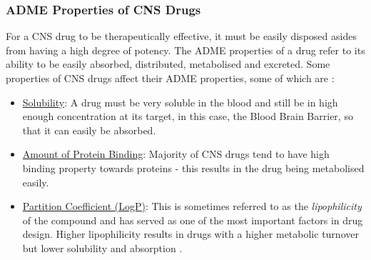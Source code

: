 \documentclass[a4paper,12pt]{report}
\begin{document}
		\subsubsection{ADME Properties of CNS Drugs}
		For a CNS drug to be therapeutically effective, it must be easily disposed asides from having a high degree of potency. The ADME properties of a drug refer to its ability to be easily absorbed, distributed, metabolised and excreted. Some properties of CNS drugs affect their ADME properties, some of which are \cite{Hassanetal2005}:
			\begin{itemize}
				\item \underline{Solubility}: A drug must be very soluble in the blood and still be in high enough concentration at its target, in this case, the Blood Brain Barrier, so that it can easily be absorbed.
				\item \underline{Amount of Protein Binding}: Majority of CNS drugs tend to have high binding property towards proteins - this results in the drug being metabolised easily.
				\item \underline{Partition Coefficient (LogP)}: This is sometimes referred to as the \textit{lipophilicity} of the compound and has served as one of the most important factors in drug design. Higher lipophilicity results in drugs with a 
				higher metabolic turnover but lower solubility and absorption \cite{Hassanetal2005}. 
			\end{itemize}

	
	
\end{document}
